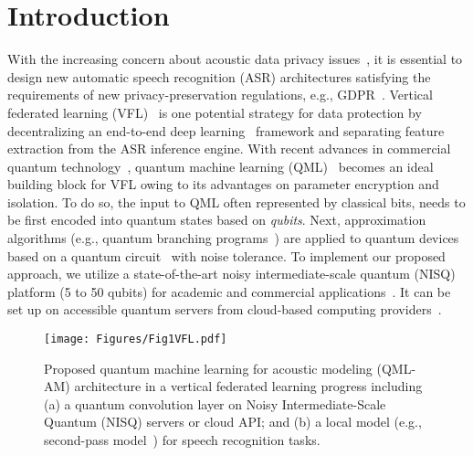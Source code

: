 \documentclass{article}
\begin{document}
\section{Introduction}
\label{sec1}
With the increasing concern about acoustic data privacy issues~\cite{leroy2019federated}, it is essential to design new automatic speech recognition (ASR) architectures satisfying the requirements of new privacy-preservation regulations, e.g., GDPR~\cite{voigt2017eu}. Vertical federated learning (VFL)~\cite{yang2019federated} is one potential strategy for data protection by decentralizing an end-to-end deep learning~\cite{deng2013new} framework and separating feature extraction from the ASR inference engine. With recent advances in commercial quantum technology~\cite{mohseni2017commercialize}, quantum machine learning (QML)~\cite{mitarai2018quantum} becomes an ideal building block for VFL owing to its advantages on parameter encryption and isolation. To do so, the input to QML often represented by classical bits, needs to be first encoded into quantum states based on \emph{qubits}. Next, approximation algorithms (e.g., quantum branching programs~\cite{bergholm2018pennylane}) are applied to quantum devices based on a quantum circuit~\cite{havlivcek2019supervised} with noise tolerance. To implement our proposed approach, we utilize a state-of-the-art noisy intermediate-scale quantum (NISQ)~\cite{farhi2000quantum} platform (5 to 50 qubits) for academic and commercial applications~\cite{preskill2018quantum}. It can be set up on accessible quantum servers from cloud-based computing providers~\cite{mohseni2017commercialize}.

\begin{figure}[t]
\begin{center}
\vspace{-2mm}
  \texttt{[image: Figures/Fig1VFL.pdf]}
\end{center}
  \caption{Proposed quantum machine learning for acoustic modeling (QML-AM) architecture in a vertical federated learning progress including (a) a quantum convolution layer on Noisy Intermediate-Scale Quantum (NISQ) servers or cloud API; and (b) a local model (e.g., second-pass model~\cite{ chen2019federated,yang2020multi}) for speech recognition tasks. 
  } 
\label{fig:1:vfl}
\end{figure}
\end{document}

